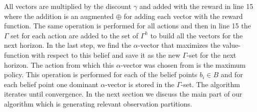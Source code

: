 \documentclass{article} %
\newcommand{\close}{\mathit{close}}
\begin{document}
All vectors are multiplied by the discount $\gamma$ and added with the reward in line 15 where the addition is an augmented $\oplus$ for adding each vector with the reward function. 
The same operation is performed for all actions and then in line 15 the $\Gamma$ set for each action are added to the set of $\Gamma^h$ to build all the vectors for the next horizon. 
In the last step, we find the $\alpha$-vector that maximizes the value-function with respect to this belief and save it as the new $\Gamma$-set for the next horizon. The action from which this $\alpha$-vector was chosen from is the maximum policy. 
This operation is performed for each of the belief points $b_i \in B$ and for each belief point one dominant $\alpha$-vector is stored in the $\Gamma$-set. The algorithm iterates until convergence. 
In the next section we discuss the main part of our algorithm which is generating relevant observation partitions.
%
%   
\end{document}
